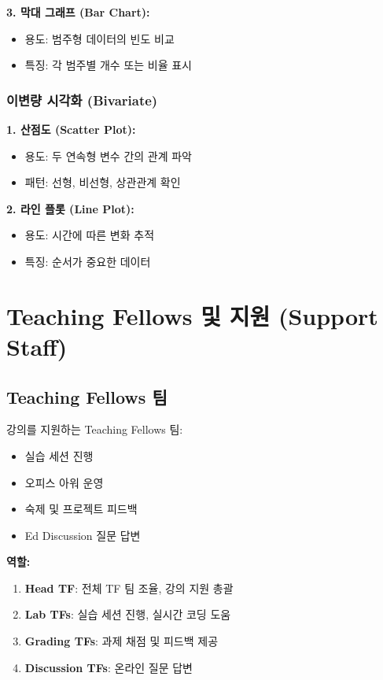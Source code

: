 \documentclass[12pt,a4paper]{article}
\begin{document}
\textbf{3. 막대 그래프 (Bar Chart):}
\begin{itemize}
    \item 용도: 범주형 데이터의 빈도 비교
    \item 특징: 각 범주별 개수 또는 비율 표시
\end{itemize}

\subsubsection{이변량 시각화 (Bivariate)}

\textbf{1. 산점도 (Scatter Plot):}
\begin{itemize}
    \item 용도: 두 연속형 변수 간의 관계 파악
    \item 패턴: 선형, 비선형, 상관관계 확인
\end{itemize}

\textbf{2. 라인 플롯 (Line Plot):}
\begin{itemize}
    \item 용도: 시간에 따른 변화 추적
    \item 특징: 순서가 중요한 데이터
\end{itemize}

\section{Teaching Fellows 및 지원 (Support Staff)}

\subsection{Teaching Fellows 팀}

강의를 지원하는 Teaching Fellows 팀:
\begin{itemize}
    \item 실습 세션 진행
    \item 오피스 아워 운영
    \item 숙제 및 프로젝트 피드백
    \item Ed Discussion 질문 답변
\end{itemize}

\textbf{역할:}
\begin{enumerate}
    \item \textbf{Head TF}: 전체 TF 팀 조율, 강의 지원 총괄
    \item \textbf{Lab TFs}: 실습 세션 진행, 실시간 코딩 도움
    \item \textbf{Grading TFs}: 과제 채점 및 피드백 제공
    \item \textbf{Discussion TFs}: 온라인 질문 답변
\end{enumerate}
\end{document}
